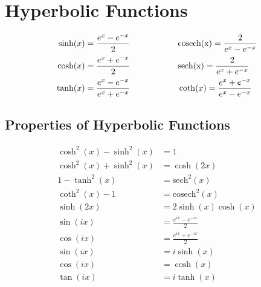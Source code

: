 \section{Hyperbolic Functions}
\begin{align*}
\sinh(x) &= \frac{e^x - e^{-x}}{2} \hspace{20mm} \mathrm{cosech(x)} = \frac{2}{e^x - e^{-x}}\\
\cosh(x) &= \frac{e^x + e^{-x}}{2} \hspace{20mm} \mathrm{sech(x)} = \frac{2}{e^x + e^{-x}}\\
\tanh(x) &= \frac{e^x - e^{-x}}{e^x + e^{-x}} \hspace{20mm} \coth(x) = \frac{e^x + e^{-x}}{e^x - e^{-x}}
\end{align*}

\subsection{Properties of Hyperbolic Functions}
\begin{align*}
\cosh^2(x) - \sinh^2(x) &= 1\\
\cosh^2(x) + \sinh^2(x) &= \cosh(2x)\\
1 - \tanh^2(x) &= \mathrm{sech}^2(x)\\
\coth^2(x) - 1 &= \mathrm{cosech}^2(x)\\
\sinh(2x) &= 2\sinh(x)\cosh(x)\\
\sin(ix) &= \frac{e^{ix} - e^{-ix}}{2}\\
\cos(ix) &= \frac{e^{ix} + e^{-ix}}{2}\\
\sin(ix) &= i\sinh(x)\\
\cos(ix) &= \cosh(x)\\
\tan(ix) &= i\tanh(x)
\end{align*}